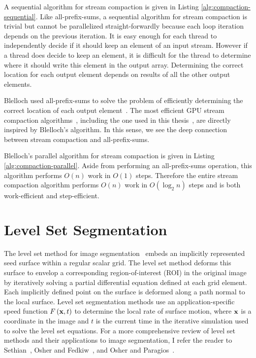 A sequential algorithm for stream compaction is given in Listing \ref{alg:compaction-sequential}. Like all-prefix-sums, a sequential algorithm for stream compaction is trivial but cannot be parallelized straight-forwardly because each loop iteration depends on the previous iteration. It is easy enough for each thread to independently decide if it should keep an element of an input stream. However if a thread does decide to keep an element, it is difficult for the thread to determine where it should write this element in the output array. Determining the correct location for each output element depends on results of all the other output elements. 

Blelloch used all-prefix-sums to solve the problem of efficiently determining the correct location of each output element~\cite{Blelloch-1993}. The most efficient GPU stream compaction algorithms~\cite{Dotsenko-2008,Sengupta-2011}, including the one used in this thesis~\cite{Sengupta-2011}, are directly inspired by Blelloch's algorithm. In this sense, we see the deep connection between stream compaction and all-prefix-sums. 

Blelloch's parallel algorithm for stream compaction is given in Listing \ref{alg:compaction-parallel}. Aside from performing an all-prefix-sums operation, this algorithm performs $O(n)$ work in $O(1)$ steps. Therefore the entire stream compaction algorithm performs $O(n)$ work in $O(\log_2 n)$ steps and is both work-efficient and step-efficient.

\section{Level Set Segmentation}

The level set method for image segmentation~\cite{Whitaker-1994} embeds an implicitly represented seed surface within a regular scalar grid. The level set method deforms this surface to envelop a corresponding region-of-interest (ROI) in the original image by iteratively solving a partial differential equation defined at each grid element. Each implicitly defined point on the surface is deformed along a path normal to the local surface. Level set segmentation methods  use an application-specific speed function $ F \left( {\mathbf x} , t \right) $ to determine the local rate of surface motion, where ${\mathbf x}$ is a coordinate in the image and $t$ is the current time in the iterative simulation used to solve the level set equations. For a more comprehensive review of level set methods and their applications to image segmentation, I refer the reader to Sethian~\cite{Sethian-1999}, Osher and Fedkiw~\cite{Osher-2002}, and Osher and Paragios~\cite{Osher-2003}.

